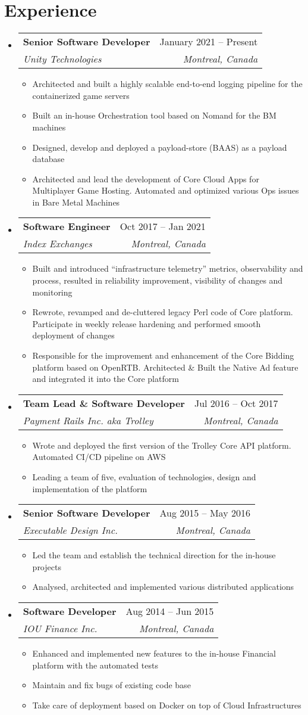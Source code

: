 \documentclass[a4paper,11pt]{article}
\makeatletter
\newcommand{\resumeItem}[1]{
  \item\small{#1}
}
\newcommand{\resumeItemListStart}{\begin{itemize}[rightmargin=0.11in]}
\newcommand{\resumeItemListEnd}{\end{itemize}}
\newcommand{\resumeQuadHeading}[4]{
  \item
  \begin{tabular*}{0.96\textwidth}[t]{l@{\extracolsep{\fill}}r}
    \textbf{#1} & #2 \\
    \textit{\small#3} & \textit{\small #4} \\
  \end{tabular*}
}
\newcommand{\resumeHeadingListStart}{
  \begin{itemize}[leftmargin=0.15in, label={}]
}
\newcommand{\resumeHeadingListEnd}{\end{itemize}}
\makeatother
\begin{document}

\section{Experience}
\resumeHeadingListStart{}
  \resumeQuadHeading{Senior Software Developer}{January 2021 -- Present}
  {Unity Technologies}{Montreal, Canada}
    \resumeItemListStart{}
      \resumeItem{Architected and built a highly scalable end-to-end logging pipeline for the containerized game servers }
      \resumeItem{Built an in-house Orchestration tool based on Nomand for the BM machines }
      \resumeItem{Designed, develop and deployed a payload-store (BAAS) as a payload database }
      \resumeItem{Architected and lead the development of Core Cloud Apps for Multiplayer Game Hosting. Automated and optimized various Ops issues in Bare Metal Machines}
    \resumeItemListEnd{}

  \resumeQuadHeading{Software Engineer}{Oct 2017 -- Jan 2021}
  {Index Exchanges}{Montreal, Canada}
    \resumeItemListStart{}
    \resumeItem { Built and introduced “infrastructure telemetry” metrics, observability and process, resulted in reliability improvement, visibility of changes and monitoring }
      \resumeItem{Rewrote, revamped and de-cluttered legacy Perl code of Core platform. Participate in weekly release hardening and performed smooth deployment of changes }
      \resumeItem{Responsible for the improvement and enhancement of the Core Bidding platform based on OpenRTB. Architected \& Built the Native Ad feature and integrated it into the Core platform}
    \resumeItemListEnd{}

  \resumeQuadHeading{Team Lead \& Software Developer}{Jul 2016 -- Oct 2017}
  {Payment Rails Inc. aka Trolley}{Montreal, Canada}
    \resumeItemListStart{}
      \resumeItem{Wrote and deployed the first version of the Trolley Core API platform. Automated CI/CD pipeline on AWS }
      \resumeItem{Leading a team of five, evaluation of technologies, design and implementation of the platform }
    \resumeItemListEnd{}
\resumeQuadHeading{Senior Software Developer}{Aug 2015 -- May 2016}
  {Executable Design Inc.}{Montreal, Canada}
    \resumeItemListStart{}
      \resumeItem{Led the team and establish the technical direction for the in-house projects}
      \resumeItem{Analysed, architected and implemented various distributed applications}
    \resumeItemListEnd{}
\resumeQuadHeading{Software Developer}{Aug 2014 -- Jun 2015}
  {IOU Finance Inc.}{Montreal, Canada}
    \resumeItemListStart{}
      \resumeItem{Enhanced and implemented new features to the in-house Financial platform with the automated tests }
      \resumeItem{Maintain and fix bugs of existing code base}
      \resumeItem{Take care of deployment based on Docker on top of Cloud Infrastructures}
    \resumeItemListEnd{}
\resumeHeadingListEnd{}
\end{document}
